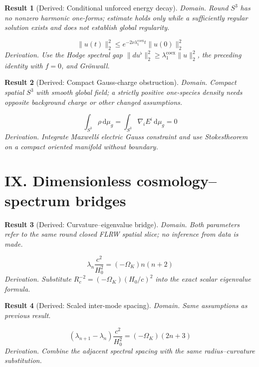 \documentclass[aps,prd,onecolumn,notitlepage,groupedaddress,11pt]{revtex4-2}
\newtheorem{result}{Result}
\begin{document}
\begin{result}[\textsf{Derived}: Conditional unforced energy decay]\label{res:47}
\textit{Domain.} Round $S^3$ has no nonzero harmonic one-forms; estimate holds only while a sufficiently regular solution exists and does not establish global regularity.\par
\begin{equation}\label{eq:47}
\|u(t)\|_2^2\le e^{-2\nu\lambda_1^{\mathrm{coex}}t}\|u(0)\|_2^2
\end{equation}
\textit{Derivation.} Use the Hodge spectral gap $\|du^\flat\|_2^2\ge\lambda_1^{\mathrm{coex}}\|u\|_2^2$, the preceding identity with $f=0$, and Gr\"onwall.
\end{result}

\begin{result}[\textsf{Derived}: Compact Gauss-charge obstruction]\label{res:48}
\textit{Domain.} Compact spatial $S^3$ with smooth global field; a strictly positive one-species density needs opposite background charge or other changed assumptions.\par
\begin{equation}\label{eq:48}
\int_{S^3}\rho\,\mathrm d\mu_g=\int_{S^3}\nabla_iE^i\,\mathrm d\mu_g=0
\end{equation}
\textit{Derivation.} Integrate Maxwell\'s electric Gauss constraint and use Stokes\' theorem on a compact oriented manifold without boundary.
\end{result}

\section{IX. Dimensionless cosmology--spectrum bridges}

\begin{result}[\textsf{Derived}: Curvature--eigenvalue bridge]\label{res:49}
\textit{Domain.} Both parameters refer to the same round closed FLRW spatial slice; no inference from data is made.\par
\begin{equation}\label{eq:49}
\lambda_n\frac{c^2}{H_0^2}=(-\Omega_K)n(n+2)
\end{equation}
\textit{Derivation.} Substitute $R_c^{-2}=(-\Omega_K)(H_0/c)^2$ into the exact scalar eigenvalue formula.
\end{result}

\begin{result}[\textsf{Derived}: Scaled inter-mode spacing]\label{res:50}
\textit{Domain.} Same assumptions as previous result.\par
\begin{equation}\label{eq:50}
(\lambda_{n+1}-\lambda_n)\frac{c^2}{H_0^2}=(-\Omega_K)(2n+3)
\end{equation}
\textit{Derivation.} Combine the adjacent spectral spacing with the same radius--curvature substitution.
\end{result}
\end{document}
